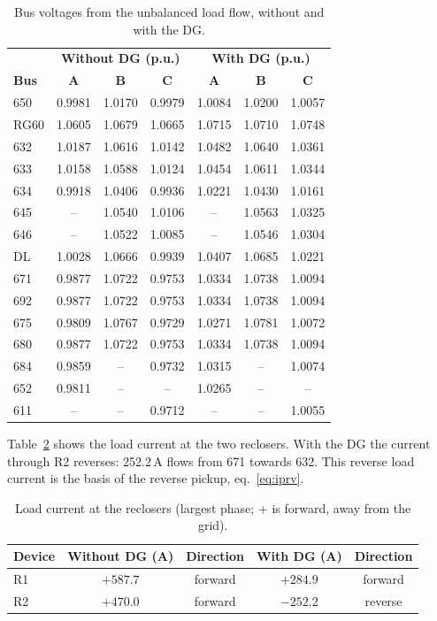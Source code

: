 \documentclass[12pt,a4paper]{article}
\begin{document}
\begin{table}[H]
\centering\small
\begin{tabular}{|l|c|c|c|c|c|c|}
\hline
 & \multicolumn{3}{c|}{\textbf{Without DG (p.u.)}} & \multicolumn{3}{c|}{\textbf{With DG (p.u.)}} \\
\textbf{Bus} & \textbf{A} & \textbf{B} & \textbf{C} & \textbf{A} & \textbf{B} & \textbf{C} \\ \hline
650 & 0.9981 & 1.0170 & 0.9979 & 1.0084 & 1.0200 & 1.0057 \\ \hline
RG60 & 1.0605 & 1.0679 & 1.0665 & 1.0715 & 1.0710 & 1.0748 \\ \hline
632 & 1.0187 & 1.0616 & 1.0142 & 1.0482 & 1.0640 & 1.0361 \\ \hline
633 & 1.0158 & 1.0588 & 1.0124 & 1.0454 & 1.0611 & 1.0344 \\ \hline
634 & 0.9918 & 1.0406 & 0.9936 & 1.0221 & 1.0430 & 1.0161 \\ \hline
645 & -- & 1.0540 & 1.0106 & -- & 1.0563 & 1.0325 \\ \hline
646 & -- & 1.0522 & 1.0085 & -- & 1.0546 & 1.0304 \\ \hline
DL & 1.0028 & 1.0666 & 0.9939 & 1.0407 & 1.0685 & 1.0221 \\ \hline
671 & 0.9877 & 1.0722 & 0.9753 & 1.0334 & 1.0738 & 1.0094 \\ \hline
692 & 0.9877 & 1.0722 & 0.9753 & 1.0334 & 1.0738 & 1.0094 \\ \hline
675 & 0.9809 & 1.0767 & 0.9729 & 1.0271 & 1.0781 & 1.0072 \\ \hline
680 & 0.9877 & 1.0722 & 0.9753 & 1.0334 & 1.0738 & 1.0094 \\ \hline
684 & 0.9859 & -- & 0.9732 & 1.0315 & -- & 1.0074 \\ \hline
652 & 0.9811 & -- & -- & 1.0265 & -- & -- \\ \hline
611 & -- & -- & 0.9712 & -- & -- & 1.0055 \\ \hline
\end{tabular}
\caption{Bus voltages from the unbalanced load flow, without and with the DG.}
\label{tab:volt}
\end{table}

Table~\ref{tab:lf} shows the load current at the two reclosers. With the DG the current through R2 reverses:
252.2\,A flows from 671 towards 632. This reverse load current is the basis of the reverse pickup,
eq.~\eqref{eq:iprv}.

\begin{table}[H]
\centering\small
\begin{tabular}{|l|c|c|c|c|}
\hline
\textbf{Device} & \textbf{Without DG (A)} & \textbf{Direction} & \textbf{With DG (A)} & \textbf{Direction} \\ \hline
R1 & $+587.7$ & forward & $+284.9$ & forward \\ \hline
R2 & $+470.0$ & forward & $-252.2$ & reverse \\ \hline
\end{tabular}
\caption{Load current at the reclosers (largest phase; + is forward, away from the grid).}
\label{tab:lf}
\end{table}
\end{document}
